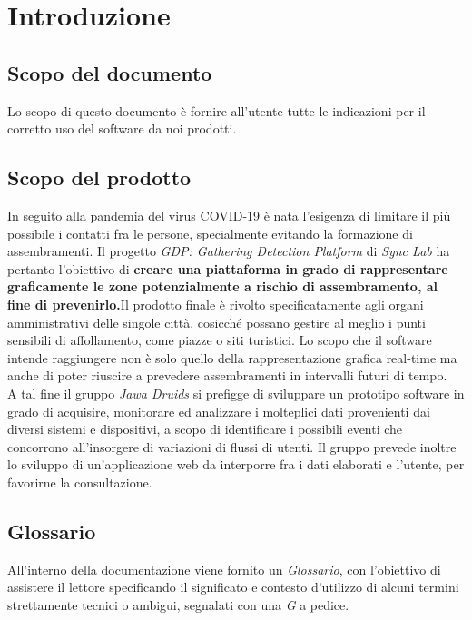 \chapter{Introduzione}\label{Introduzione}

\section{Scopo del documento}\label{IntroduzioneScopoDelDocumento}

Lo scopo di questo documento è fornire all'utente tutte le indicazioni per il corretto uso del software da noi prodotti.

\section{Scopo del prodotto}\label{IntroduzioneScopoDelProdotto}

In seguito alla pandemia del virus COVID-19 è nata l'esigenza di limitare il più possibile i
contatti fra le persone, specialmente evitando la formazione di assembramenti. 
Il progetto \textit{GDP: Gathering Detection Platform} di \textit{Sync Lab} ha pertanto l'obiettivo di \textbf{creare una piattaforma in grado di rappresentare graficamente le zone potenzialmente a rischio di assembramento, al fine di prevenirlo.}Il prodotto finale è rivolto specificatamente agli
organi amministrativi delle singole città, cosicché possano gestire al meglio i punti sensibili di
affollamento, come piazze o siti turistici. Lo scopo che il software intende raggiungere non è
solo quello della rappresentazione grafica real-time ma anche di poter riuscire a prevedere
assembramenti in intervalli futuri di tempo.
\\
A tal fine il gruppo \textit{Jawa Druids} si prefigge di sviluppare un prototipo software in grado di acquisire, monitorare ed analizzare i molteplici dati provenienti dai diversi sistemi e dispositivi, a scopo di identificare i possibili eventi che concorrono all'insorgere di variazioni di flussi di utenti. Il gruppo prevede inoltre lo sviluppo di un'applicazione web da interporre fra i dati elaborati e l'utente, per favorirne la consultazione.

\section{Glossario}\label{IntroduzioneGlossario}

All'interno della documentazione viene fornito un \textit{Glossario}, con l'obiettivo di assistere il lettore specificando il significato e contesto d'utilizzo di alcuni termini strettamente tecnici o ambigui, segnalati con una \textit{G} a pedice.


